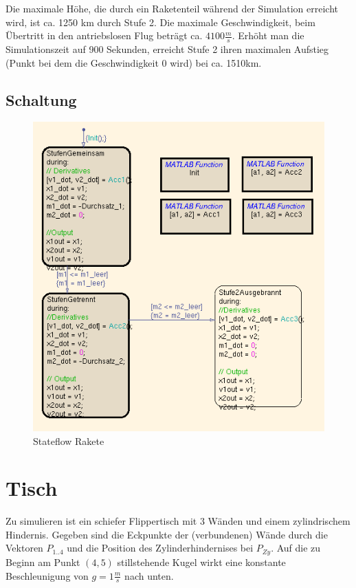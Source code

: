 \documentclass[10pt]{scrartcl}
\begin{document}
	Die maximale Höhe, die durch ein Raketenteil während der Simulation erreicht wird, ist ca. 1250 km durch Stufe 2. Die maximale Geschwindigkeit, beim Übertritt in den antriebslosen Flug beträgt ca. $4100 \frac{m}{s}$.
	Erhöht man die Simulationszeit auf 900 Sekunden, erreicht Stufe 2 ihren maximalen Aufstieg (Punkt bei dem die Geschwindigkeit 0 wird) bei ca. 1510km.
	
	\subsection{Schaltung}
	\begin{figure}[htbp]
		\centering
		\includegraphics[scale=0.55]{ScreenshotRaketeAutomat.png}
		\caption{Stateflow Rakete}
		\label{pic:stateflowRakete}
	\end{figure}

	
\section{Tisch}	
Zu simulieren ist ein schiefer Flippertisch mit 3 Wänden und einem zylindrischem Hindernis. Gegeben sind die Eckpunkte der (verbundenen) Wände durch die Vektoren $P_{1..4}$ und die Position des Zylinderhindernises bei $P_{Zy}$. Auf die zu Beginn am Punkt $(4,5)$ stillstehende Kugel wirkt eine konstante Beschleunigung von $g=1\frac{m}{s}$ nach unten. 
		
\end{document}
